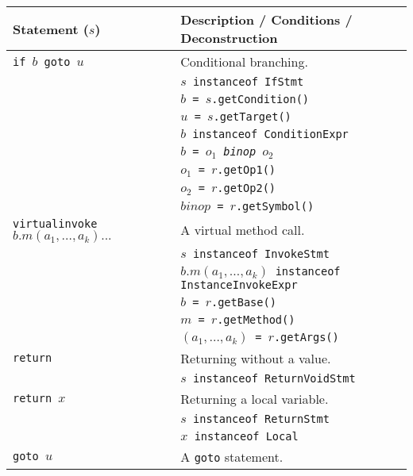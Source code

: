 \documentclass{article}
\begin{document}
\begin{scriptsize}
\begin{tabular}{ll}
\hline
\textbf{Statement} ($s$)      & \textbf{Description / Conditions / Deconstruction}\\
\hline
\hline
\texttt{if $b$ goto $u$} & Conditional branching.\\
                & \texttt{$s$ instanceof IfStmt}\\
                & \texttt{$b$ = $s$.getCondition()}\\
                & \texttt{$u$ = $s$.getTarget()}\\
                & \texttt{$b$ instanceof ConditionExpr}\\
                & \texttt{$b$ = $o_1$ \textit{binop} $o_2$}\\
                & \texttt{$o_1$ = $r$.getOp1()}\\
                & \texttt{$o_2$ = $r$.getOp2()}\\
                & \texttt{$\textit{binop}$ = $r$.getSymbol()}\\
\hline
\texttt{virtualinvoke $b.m(a_1,\ldots,a_k)...$}              & A virtual method call.\\
                & \texttt{$s$ instanceof InvokeStmt}\\
                & \texttt{$b.m(a_1,\ldots,a_k)$ instanceof InstanceInvokeExpr}\\
                & \texttt{$b$ = $r$.getBase()}\\
                & \texttt{$m$ = $r$.getMethod()}\\
                & \texttt{$(a_1,\ldots,a_k)$ = $r$.getArgs()}\\
\hline
\texttt{return} & Returning without a value.\\
                & \texttt{$s$ instanceof ReturnVoidStmt}\\
\hline
\texttt{return $x$} & Returning a local variable.\\
                & \texttt{$s$ instanceof ReturnStmt}\\
                & \texttt{$x$ instanceof Local}\\
\hline
\texttt{goto $u$}    & A \texttt{goto} statement.\\

\end{tabular}
\end{scriptsize}
\end{document}
